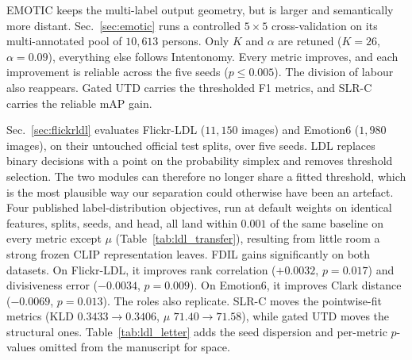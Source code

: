{

 EMOTIC keeps the multi-label output geometry, but is larger and semantically more distant. Sec.~\ref{sec:emotic} runs a controlled $5\times5$ cross-validation on its multi-annotated pool of $10{,}613$ persons. Only $K$ and $\alpha$ are retuned ($K{=}26$, $\alpha{=}0.09$), everything else follows Intentonomy. Every metric improves, and each improvement is reliable across the five seeds ($p\le0.005$). The division of labour also reappears. Gated UTD carries the thresholded F1 metrics, and SLR-C carries the reliable mAP gain.

 Sec.~\ref{sec:flickrldl} evaluates Flickr-LDL ($11{,}150$ images) and Emotion6 ($1{,}980$ images), on their untouched official test splits, over five seeds. LDL replaces binary decisions with a point on the probability simplex and removes threshold selection. The two modules can therefore no longer share a fitted threshold, which is the most plausible way our separation could otherwise have been an artefact. Four published label-distribution objectives, run at default weights on identical features, splits, seeds, and head, all land within $0.001$ of the same baseline on every metric except $\mu$ (Table~\ref{tab:ldl_transfer}), resulting from little room a strong frozen CLIP representation leaves. FDIL gains significantly on both datasets. On Flickr-LDL, it improves rank correlation ($+0.0032$, $p=0.017$) and divisiveness error ($-0.0034$, $p=0.009$). On Emotion6, it improves Clark distance ($-0.0069$, $p=0.013$). The roles also replicate. SLR-C moves the pointwise-fit metrics (KLD $0.3433\!\rightarrow\!0.3406$, $\mu$ $71.40\!\rightarrow\!71.58$), while gated UTD moves the structural ones. Table~\ref{tab:ldl_letter} adds the seed dispersion and per-metric $p$-values omitted from the manuscript for space.
}
\showFlickrLDL

